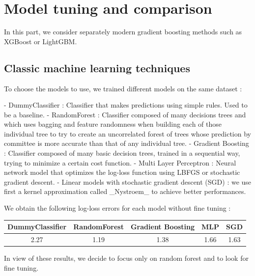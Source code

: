 \documentclass{article}
\begin{document}
\section{Model tuning and comparison}

In this part, we consider separately modern gradient boosting methods such as XGBoost or LightGBM.

\subsection{Classic machine learning techniques}
\begin{markdown}

To choose the models to use, we trained different models on the same dataset :

- DummyClassifier : Classifier that makes predictions using simple rules. Used to be a baseline.
- RandomForest : Classifier composed of many decisions trees and which uses bagging and feature randomness when building each of those individual tree to try to create an uncorrelated forest of trees whose prediction by committee is more accurate than that of any individual tree.
- Gradient Boosting : Classifier composed of many basic decision trees, trained in a sequential way, trying to minimize a certain cost function.
- Multi Layer Perceptron : Neural network model that optimizes the log-loss function using LBFGS or stochastic gradient descent.
- Linear models with stochastic gradient descent (SGD) : we use first a kernel approximation called _Nystroem_ to achieve better performances.

\end{markdown}

We obtain the following log-loss errors for each model without fine tuning :

\begin{table}[h!]
\begin{center}
 \begin{tabular}{|c | c | c | c | c|} 
 \hline
  DummyClassifier & RandomForest & Gradient Boosting & MLP & SGD \\ [0.5ex] 
  \hline
  2.27 & 1.19 & 1.38 & 1.66 & 1.63 \\
  \hline
\end{tabular}
\end{center}
\end{table}

In view of these results, we decide to focus only on random forest and to look for fine tuning.
\end{document}
